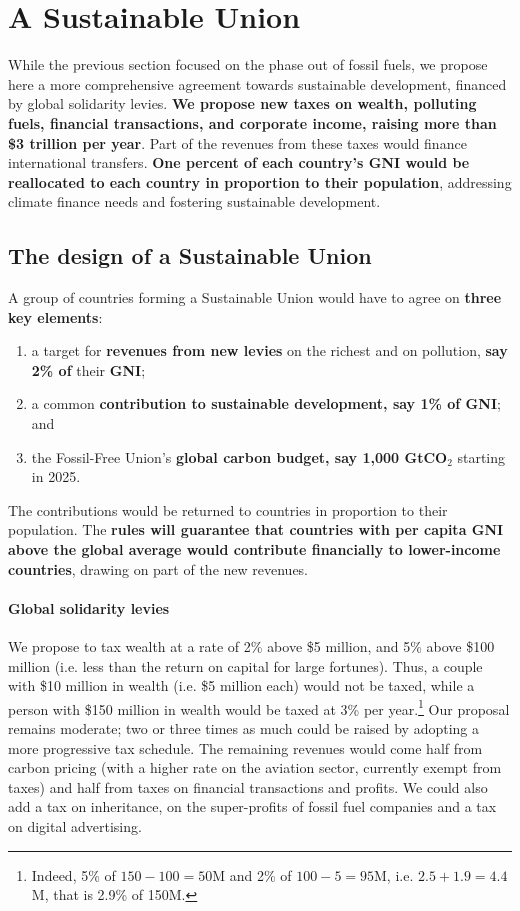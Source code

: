 \documentclass[12pt,english]{article}
\begin{document}
\clearpage

\section{A Sustainable Union\label{sec:su}}

While the previous section focused on the phase out of fossil fuels, we propose here a more comprehensive agreement towards sustainable development, financed by global solidarity levies.\textbf{ We propose new taxes on wealth, polluting fuels, financial transactions, and corporate income, raising more than \$3 trillion per year}. Part of the revenues from these taxes would finance international transfers. \textbf{One percent of each country's GNI would be reallocated to each country in proportion to their population}, addressing climate finance needs and fostering sustainable development.

\subsection{The design of a Sustainable Union\label{subsec:principles_sa}}

A group of countries forming a Sustainable Union would have to agree on \textbf{three key elements}:
\begin{enumerate}
  \item a target for \textbf{revenues from new levies} on the richest and on pollution, \textbf{say 2\% of} their \textbf{GNI};
  \item a common \textbf{contribution to sustainable development, say 1\% of GNI}; and
  \item the Fossil-Free Union's \textbf{global carbon budget, say 1,000 GtCO$_\text{2}$} starting in 2025.
\end{enumerate}

The contributions would be returned to countries in proportion to their population. 
The\textbf{ rules will guarantee that countries with per capita GNI above the global average would contribute financially to lower-income countries}, drawing on part of the new revenues. 

\paragraph{Global solidarity levies}
We propose to tax wealth at a rate of 2\% above \$5 million, and 5\% above \$100 million (i.e. less than the return on capital for large fortunes). Thus, a couple with \$10 million in wealth (i.e. \$5 million each) would not be taxed, while a person with \$150 million in wealth would be taxed at 3\% per year.\footnote{Indeed, 5\% of $150 - 100 = 50$M and 2\% of $100 - 5 = 95$M, i.e. $2.5 + 1.9 = 4.4$M, that is 2.9\% of 150M.} 
Our proposal remains moderate; two or three times as much could be raised by adopting a more progressive tax schedule. The remaining revenues would come half from carbon pricing (with a higher rate on the aviation sector, currently exempt from taxes) and half from taxes on financial transactions and profits. 
We could also add a tax on inheritance, on the super-profits of fossil fuel companies and a tax on digital advertising.\cite{acemoglu_urgent_2024} 
\end{document}
